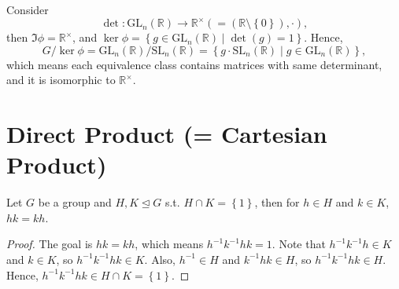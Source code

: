 \begin{eg}
    Consider
    \[
        \det : \mathrm{GL}_n(\mathbb{R} ) \to \mathbb{R} ^{\times } \left( = \left( \mathbb{R} \setminus \left\{ 0 \right\}  \right), \cdot  \right), 
    \] then \(\Im \phi = \mathbb{R} ^{\times }\), and \(\ker \phi = \left\{ g \in \mathrm{GL}_n(\mathbb{R} ) \mid \det (g) = 1  \right\} \). Hence, 
    \[
        G / \ker \phi = \mathrm{GL}_n(\mathbb{R} ) / \mathrm{SL}_n(\mathbb{R} ) = \left\{ g \cdot \mathrm{SL}_n(\mathbb{R} ) \mid g \in \mathrm{GL}_n(\mathbb{R} )   \right\},   
    \]  which means each equivalence class contains matrices with same determinant, and it is isomorphic to \(\mathbb{R} ^{\times }\).  
\end{eg}

\section{Direct Product (= Cartesian Product)} 
\begin{proposition} \label{prop: normal and cap is zero means abelian}
    Let \(G\) be a group and \(H, K \trianglelefteq G\) s.t. \(H \cap K = \left\{ 1 \right\} \), then for \(h \in H\) and \(k \in K\), \(hk = kh\).      
\end{proposition}
\begin{proof}
    The goal is \(hk = kh\), which means \(h^{-1} k^{-1} hk =1\). Note that \(h^{-1} k^{-1} h \in K\) and \(k \in K\), so \(h^{-1} k^{-1} h k \in K\). Also, \(h^{-1}\in H\) and \(k^{-1} h k \in H\), so \(h^{-1} k^{-1} h k \in H\). Hence, \(h^{-1} k^{-1} h k \in H \cap K = \left\{ 1 \right\} \).          
\end{proof}

